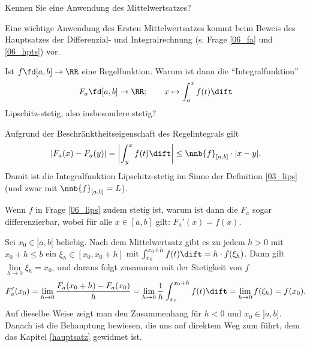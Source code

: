 \begin{frage}
Kennen Sie eine Anwendung des Mittelwertsatzes?
\end{frage}

\begin{antwort}
 
Eine wichtige Anwendung des Ersten Mittelwertsatzes kommt beim Beweis 
des Hauptsatzes der Differenzial- und Integralrechnung 
(s. Frage \ref{06_fa} und \ref{06_hpts}) vor.
\AntEnd
\end{antwort}

\begin{frage}\label{06_lips}
Ist $f\fd[a,b]\to\RR$ eine Regelfunktion. 
Warum ist dann die "`Integralfunktion"' 
\[
F_a \fd [a,b] \to \RR; \qquad x\mapsto \int_a^x f(t) \dift
\]
Lipschitz-stetig, also insbesondere stetig?
\end{frage}

\begin{antwort}
Aufgrund der Beschränktheitseigenschaft des Regelintegrals gilt
\[
\left| F_a(x) - F_a(y) \right| = 
\left| \int_y^x f(t) \dift \right| \le 
\nnb{ f }_{[a,b]} \cdot |x-y|.  
\] 
Damit ist die Integralfunktion Lipschitz-stetig im Sinne der Definition 
\ref{03_lips} (und zwar mit $\nnb{ f }_{[a,b]} =L$). \AntEnd
\end{antwort}

\begin{frage}\label{06_fa}
Wenn $f$ in Frage \ref{06_lips} zudem stetig ist, 
warum ist dann die  $F_a$ sogar differenzierbar, wobei 
für alle $x\in[a,b]$ gilt: 
$F_a'(x)=f(x)$.
\end{frage}

\begin{antwort}
Sei $x_0 \in [a,b[$ beliebig. Nach dem Mittelwertsatz gibt es 
zu jedem $h>0$ mit $x_0+h\le b$ 
ein $\xi_h \in [x_0,x_0+h]$ mit 
$\int_{x_0}^{x_0+h} f(t)\dift  = h \cdot f(\xi_h)$. 
Dann gilt $\lim\limits_{h\to 0} \xi_h=x_0$, und daraus folgt 
zusammen mit der Stetigkeit von $f$
\[  
F_a' (x_0) = 
\lim_{h\to 0} \frac{F_a(x_0+h )-F_a(x_0)}{h} = 
\lim_{h\to 0} \frac{1}{h}  \int_{x_0}^{x_0+h} f(t)\dift = 
\lim_{h\to 0} f(\xi_h) = f(x_0 ).
\]
Auf dieselbe Weise zeigt man den Zusammenhang für $h<0$ und 
$x_0 \in ]a,b]$. Danach ist die Behauptung bewiesen, die uns auf 
direktem Weg zum  
führt, dem das Kapitel \ref{hauptsatz} gewidmet ist. 
\AntEnd
\end{antwort}


